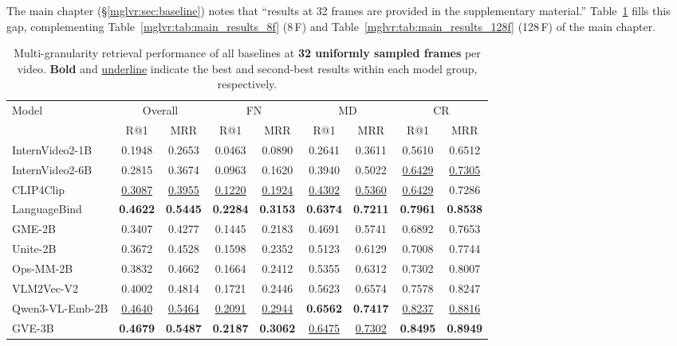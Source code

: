 The main chapter (\S\ref{mglvr:sec:baseline}) notes that ``results at 32 frames are provided in the supplementary material.'' Table~\ref{mglvr:supp:tab:32f} fills this gap, complementing Table~\ref{mglvr:tab:main_results_8f} (8\,F) and Table~\ref{mglvr:tab:main_results_128f} (128\,F) of the main chapter.

\begin{table}[t]
\centering
\caption{Multi-granularity retrieval performance of all baselines at \textbf{32 uniformly sampled frames} per video. \textbf{Bold} and \underline{underline} indicate the best and second-best results within each model group, respectively.}
\label{mglvr:supp:tab:32f}
\footnotesize
\begin{tabular}{@{}l|*{8}{c}@{}}
\toprule
Model & \multicolumn{2}{c|}{Overall} & \multicolumn{2}{c|}{FN} & \multicolumn{2}{c|}{MD} & \multicolumn{2}{c}{CR} \\
      & R@1 & MRR & R@1 & MRR & R@1 & MRR & R@1 & MRR \\
\midrule
InternVideo2-1B  & 0.1948 & 0.2653 & 0.0463 & 0.0890 & 0.2641 & 0.3611 & 0.5610 & 0.6512 \\
InternVideo2-6B  & 0.2815 & 0.3674 & 0.0963 & 0.1620 & 0.3940 & 0.5022 & \underline{0.6429} & \underline{0.7305} \\
CLIP4Clip        & \underline{0.3087} & \underline{0.3955} & \underline{0.1220} & \underline{0.1924} & \underline{0.4302} & \underline{0.5360} & \underline{0.6429} & 0.7286 \\
LanguageBind     & \textbf{0.4622} & \textbf{0.5445} & \textbf{0.2284} & \textbf{0.3153} & \textbf{0.6374} & \textbf{0.7211} & \textbf{0.7961} & \textbf{0.8538} \\
\midrule
GME-2B           & 0.3407 & 0.4277 & 0.1445 & 0.2183 & 0.4691 & 0.5741 & 0.6892 & 0.7653 \\
Unite-2B         & 0.3672 & 0.4528 & 0.1598 & 0.2352 & 0.5123 & 0.6129 & 0.7008 & 0.7744 \\
Ops-MM-2B        & 0.3832 & 0.4662 & 0.1664 & 0.2412 & 0.5355 & 0.6312 & 0.7302 & 0.8007 \\
VLM2Vec-V2       & 0.4002 & 0.4814 & 0.1721 & 0.2446 & 0.5623 & 0.6574 & 0.7578 & 0.8247 \\
Qwen3-VL-Emb-2B  & \underline{0.4640} & \underline{0.5464} & \underline{0.2091} & \underline{0.2944} & \textbf{0.6562} & \textbf{0.7417} & \underline{0.8237} & \underline{0.8816} \\
GVE-3B           & \textbf{0.4679} & \textbf{0.5487} & \textbf{0.2187} & \textbf{0.3062} & \underline{0.6475} & \underline{0.7302} & \textbf{0.8495} & \textbf{0.8949} \\

\end{tabular}
\end{table}

